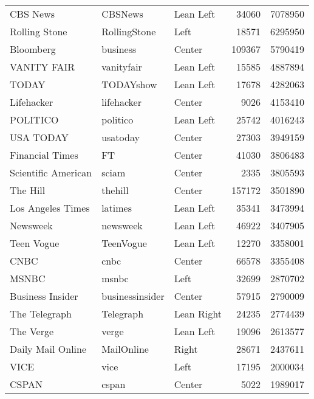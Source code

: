 \begin{tabular}{lllrr}
                CBS News &          CBSNews &     Lean Left &             34060 &    7078950 \\
           Rolling Stone &     RollingStone &          Left &             18571 &    6295950 \\
               Bloomberg &         business &        Center &            109367 &    5790419 \\
             VANITY FAIR &       vanityfair &     Lean Left &             15585 &    4887894 \\
                   TODAY &        TODAYshow &     Lean Left &             17678 &    4282063 \\
              Lifehacker &       lifehacker &        Center &              9026 &    4153410 \\
                POLITICO &         politico &     Lean Left &             25742 &    4016243 \\
               USA TODAY &         usatoday &        Center &             27303 &    3949159 \\
         Financial Times &               FT &        Center &             41030 &    3806483 \\
     Scientific American &            sciam &        Center &              2335 &    3805593 \\
                The Hill &          thehill &        Center &            157172 &    3501890 \\
       Los Angeles Times &          latimes &     Lean Left &             35341 &    3473994 \\
                Newsweek &         newsweek &     Lean Left &             46922 &    3407905 \\
              Teen Vogue &        TeenVogue &     Lean Left &             12270 &    3358001 \\
                    CNBC &             cnbc &        Center &             66578 &    3355408 \\
                   MSNBC &            msnbc &          Left &             32699 &    2870702 \\
        Business Insider &  businessinsider &        Center &             57915 &    2790009 \\
           The Telegraph &        Telegraph &    Lean Right &             24235 &    2774439 \\
               The Verge &            verge &     Lean Left &             19096 &    2613577 \\
       Daily Mail Online &       MailOnline &         Right &             28671 &    2437611 \\
                    VICE &             vice &          Left &             17195 &    2000034 \\
                   CSPAN &            cspan &        Center &              5022 &    1989017 \\
\bottomrule
\end{tabular}
